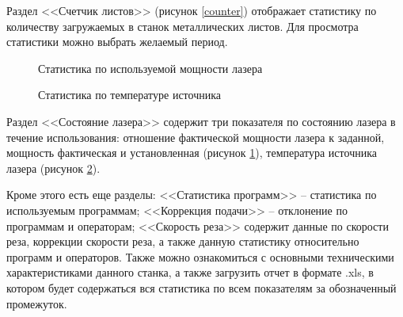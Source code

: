 Раздел <<Счетчик листов>> (рисунок \ref{counter}) отображает статистику по количеству
загружаемых в станок металлических листов.
Для просмотра статистики можно выбрать желаемый период.

\begin{figure}[h]
    \caption{Статистика по используемой мощности лазера}
    \label{laser_power}
\end{figure}

\begin{figure}[h]
    \caption{Статистика по температуре источника}
    \label{laser_temp}
\end{figure}

Раздел <<Состояние лазера>> содержит три показателя по
состоянию лазера в течение использования:
отношение фактической мощности лазера к заданной,
мощность фактическая и установленная (рисунок \ref{laser_power}), температура источника лазера (рисунок \ref{laser_temp}).

Кроме этого есть еще разделы:
<<Статистика программ>> -- статистика по используемым программам;
<<Коррекция подачи>> -- отклонение по программам и операторам;
<<Скорость реза>> содержит данные по скорости реза,
коррекции скорости реза, а также данную статистику относительно программ и операторов.
Также можно ознакомиться с основными техническими характеристиками данного станка,
а также загрузить отчет в формате .xls, в котором будет содержаться вся статистика
по всем показателям за обозначенный промежуток.

